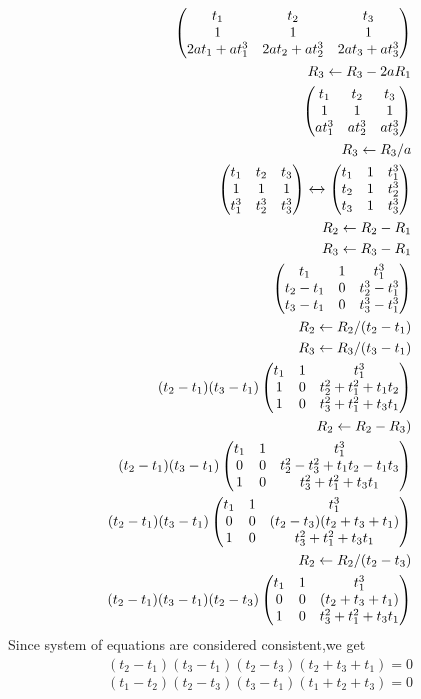 \documentclass[journal,12pt,twocolumn]{IEEEtran}
\begin{document}
\begin{align}
\begin{split}
\begin{pmatrix}t_1&t_2&t_3\\1&1&1\\2at_1+at_1^3&2at_2+at_2^3&2at_3+at_3^3
\end{pmatrix}\\
R_3\leftarrow {R_3-2aR_1}\\  
\begin{pmatrix}t_1&t_2&t_3\\1&1&1\\at_1^3&at_2^3&at_3^3\end{pmatrix}\\
R_3 \leftarrow {R_3/a}\\
\begin{pmatrix}t_1&t_2&t_3\\1&1&1\\t_1^3&t_2^3&t_3^3\end{pmatrix} \xleftrightarrow[]{}
\begin{pmatrix}t_1&1&t_1^3\\t_2&1&t_2^3\\t_3&1&t_3^3\end{pmatrix}\\
R_2 \leftarrow {R_2-R_1} \\ R_3 \leftarrow {R_3-R_1} \\
\begin{pmatrix}t_1&1&t_1^3\\t_2-t_1&0&t_2^3-t_1^3\\t_3-t_1&0&t_3^3-t_1^3\end{pmatrix}\\
R_2 \leftarrow {R_2/(t_2-t_1)}\\R_3 \leftarrow {R_3/(t_3-t_1)}\\
(t_2-t_1)(t_3-t_1)\begin{pmatrix}t_1&1&t_1^3\\1&0&t_2^2+t_1^2+t_1t_2\\1&0&t_3^2+t_1^2+t_3t_1\end{pmatrix}\\
R_2 \leftarrow {R_2-R_3)}\\
(t_2-t_1)(t_3-t_1)\begin{pmatrix}t_1&1&t_1^3\\0&0&t_2^2-t_3^2+t_1t_2-t_1t_3\\1&0&t_3^2+t_1^2+t_3t_1\end{pmatrix}\\
(t_2-t_1)(t_3-t_1)\begin{pmatrix}t_1&1&t_1^3\\0&0&(t_2-t_3)(t_2+t_3+t_1)\\1&0&t_3^2+t_1^2+t_3t_1\end{pmatrix}\\
R_2 \leftarrow {R_2/(t_2-t_3)}\\
(t_2-t_1)(t_3-t_1)(t_2-t_3)\begin{pmatrix}t_1&1&t_1^3\\0&0&(t_2+t_3+t_1)\\1&0&t_3^2+t_1^2+t_3t_1\end{pmatrix}\\
\end{split}
\end{align}
Since system of equations are considered consistent,we get
\begin{equation}
\begin{split}
(t_2-t_1)(t_3-t_1)(t_2-t_3)(t_2+t_3+t_1)=0
\end{split}
\end{equation}
\begin{equation}
(t_1-t_2)(t_2-t_3)(t_3-t_1)(t_1+t_2+t_3)=0
\label{eq:1}
\end{equation}
\end{document}
